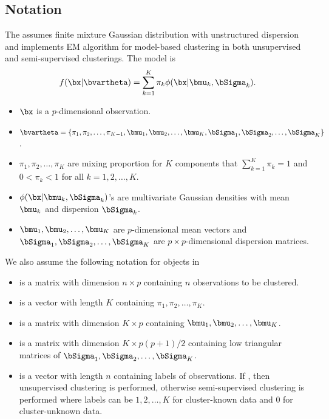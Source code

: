 \subsection[Notation]{Notation}
The  assumes finite mixture Gaussian distribution with
unstructured dispersion and implements EM algorithm for model-based clustering
in both unsupervised and semi-supervised clusterings. The model is
\begin{equation}
f(\bx | \bvartheta) = \sum_{k = 1}^K \pi_k \phi(\bx | \bmu_k, \bSigma_k).
\label{eqn:density_mvn}
\end{equation}
\begin{itemize}
\item
  $\bx$ is a $p$-dimensional observation.
\item
  $\bvartheta = \{\pi_1,\pi_2,\ldots,\pi_{K-1},\bmu_1,\bmu_2,\ldots,\bmu_K,
    \bSigma_1,\bSigma_2,\ldots,\bSigma_K\}$.
\item
  $\pi_1,\pi_2,\ldots,\pi_K$ are mixing proportion for $K$ components that
  $\sum_{k = 1}^K \pi_k = 1$ and $0 < \pi_k < 1$ for all $k=1,2,\ldots,K$.
\item
  $\phi(\bx|\bmu_k,\bSigma_k)$'s are multivariate Gaussian densities with mean
  $\bmu_k$ and dispersion $\bSigma_k$.
\item
  $\bmu_1,\bmu_2,\ldots,\bmu_K$ are $p$-dimensional mean vectors and
  $\bSigma_1,\bSigma_2,\ldots,\bSigma_K$ are $p\times p$-dimensional
  dispersion matrices.
\end{itemize}

We also assume the following notation for  objects
in 
\begin{itemize}
\item
   is a matrix with dimension $n\times p$
  containing $n$ observations to be clustered.
\item
   is a vector with length $K$ containing $\pi_1,\pi_2,\ldots,\pi_K$.
\item
   is a matrix with dimension $K\times p$ containing
  $\bmu_1,\bmu_2,\ldots,\bmu_K$.
\item
   is a matrix with dimension $K\times p(p+1)/2$ containing
  low triangular matrices of $\bSigma_1,\bSigma_2,\ldots,\bSigma_K$.
\item
   is a vector with length $n$ containing labels of observations.
  If , then unsupervised clustering is performed, otherwise
  semi-supervised clustering is performed where labels can be
  $1, 2,\ldots,K$ for cluster-known data and $0$ for cluster-unknown data.
\end{itemize}

